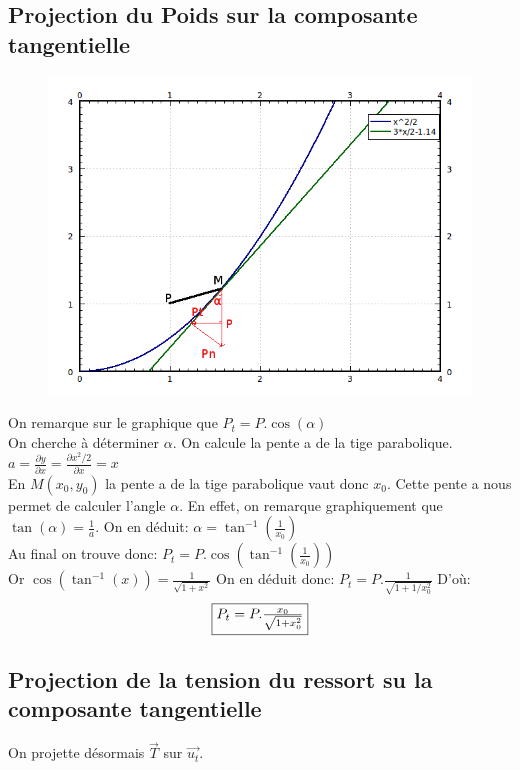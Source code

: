 \documentclass[10pt,a4paper]{article}
\begin{document}
\subsection{Projection du Poids sur la composante tangentielle}
\begin{figure}[H]
	\includegraphics[scale=0.7]{GraphMathZoomProjectionPoids.png}
\end{figure}

On remarque sur le graphique que $P_t=P.\cos(\alpha)$\\
On cherche à déterminer $\alpha$.
On calcule la pente a de la tige parabolique. $a=\frac{\partial y}{\partial x}=\frac{\partial x^2/2}{\partial x}=x$ \\
En $M(x_0,y_0)$ la pente a de la tige parabolique vaut donc $x_0$.
Cette pente a nous permet de calculer l'angle $\alpha$. En effet, on remarque graphiquement que $\tan(\alpha)=\frac{1}{a}$. On en déduit: $\alpha=\tan^{-1}(\frac{1}{x_0})$\\
Au final on trouve donc: $P_t=P.\cos(\tan^{-1}(\frac{1}{x_0})) $\\
Or $\cos(\tan^{-1}(x))=\frac{1}{\sqrt{1+x^2}}$  On en déduit donc: $P_t=P.\frac{1}{\sqrt{1+1/x^2_0}}$ D'où: 
\[\fbox{$P_t=P.\frac{x_0}{\sqrt{1+x^2_0}}$}\]

\subsection{Projection de la tension du ressort su la composante tangentielle}
On projette désormais $\vec{T}$ sur $\vec{u_t}$.\\
\end{document}
